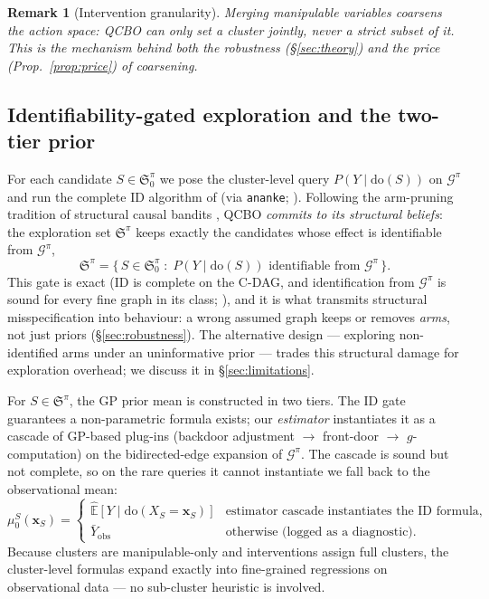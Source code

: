 \documentclass{article}
\newtheorem{remark}{Remark}
\newcommand{\E}{\mathbb{E}}
\renewcommand{\do}{\mathrm{do}}
\newcommand{\QCBO}{\textsc{QCBO}}
\newcommand{\Gq}{\mathcal{G}^{\pi}}
\newcommand{\ESpi}{\mathfrak{S}^{\pi}}
\begin{document}
\begin{remark}[Intervention granularity]
\label{rem:granularity}
Merging manipulable variables coarsens the \emph{action space}: \QCBO{}
can only set a cluster jointly, never a strict subset of it. This is the
mechanism behind both the robustness (\S\ref{sec:theory}) and the price
(Prop.~\ref{prop:price}) of coarsening.
\end{remark}

\subsection{Identifiability-gated exploration and the two-tier prior}
\label{sec:causal_prior}

For each candidate $S \in \ESpi_0$ we pose the cluster-level query $P(Y
\mid \do(S))$ on $\Gq$ and run the complete ID algorithm of
\citet{shpitser2006identification} (via \texttt{ananke};
\citealp{lee2023ananke}). Following the arm-pruning tradition of
structural causal bandits \citep{lee2018structural}, \QCBO{} \emph{commits
to its structural beliefs}: the exploration set $\ESpi$ keeps exactly the
candidates whose effect is identifiable from $\Gq$,
\begin{equation}
  \label{eq:es_gate}
  \ESpi = \{\, S \in \ESpi_0 \;:\; P(Y \mid \do(S)) \text{ identifiable
  from } \Gq \,\}.
\end{equation}
This gate is exact (ID is complete on the C-DAG, and identification from
$\Gq$ is sound for every fine graph in its class;
\citealp{anand2023cdag}), and it is what transmits structural
misspecification into behaviour: a wrong assumed graph keeps or removes
\emph{arms}, not just priors (\S\ref{sec:robustness}). The alternative
design --- exploring non-identified arms under an uninformative prior ---
trades this structural damage for exploration overhead; we discuss it in
\S\ref{sec:limitations}.

For $S \in \ESpi$, the GP prior mean is constructed in two tiers. The ID
gate guarantees a non-parametric formula exists; our \emph{estimator}
instantiates it as a cascade of GP-based plug-ins (backdoor adjustment
$\to$ front-door $\to$ $g$-computation) on the bidirected-edge expansion
of $\Gq$. The cascade is sound but not complete, so on the rare queries it
cannot instantiate we fall back to the observational mean:
\begin{equation}
  \label{eq:two_tier_prior}
  \mu_0^S(\mathbf{x}_S) = \begin{cases}
    \hat{\E}[Y \mid \do(X_S = \mathbf{x}_S)] & \text{estimator cascade
    instantiates the ID formula,} \\
    \bar{Y}_{\mathrm{obs}} & \text{otherwise (logged as a diagnostic).}
  \end{cases}
\end{equation}
Because clusters are manipulable-only and interventions assign full
clusters, the cluster-level formulas expand exactly into fine-grained
regressions on observational data --- no sub-cluster heuristic is
involved.
\end{document}
